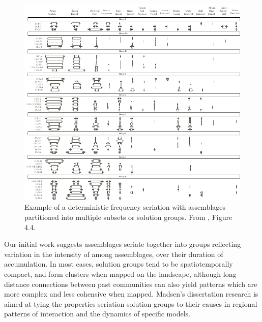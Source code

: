 \begin{figure}
	\includegraphics[scale=0.75]{graphics/seriationcombinatorics/lipo-figure-4-4.pdf}
	\caption{Example of a deterministic frequency seriation with assemblages partitioned into multiple subsets or solution groups.  From \citet{Lipo2001b}, Figure 4.4.}
	\label{fig:mult-seriation-groups}
\end{figure}

Our initial work suggests assemblages seriate together into groups reflecting variation in the intensity of \ct among assemblages, over their duration of accumulation. In most cases, solution groups tend to be spatiotemporally compact, and form clusters when mapped on the landscape, although long-distance connections between past communities can also yield patterns which are more complex and less cohensive when mapped.  Madsen's dissertation research is aimed at tying the properties seriation solution groups to their causes in regional patterns of interaction and the dynamics of specific \ct models.  

